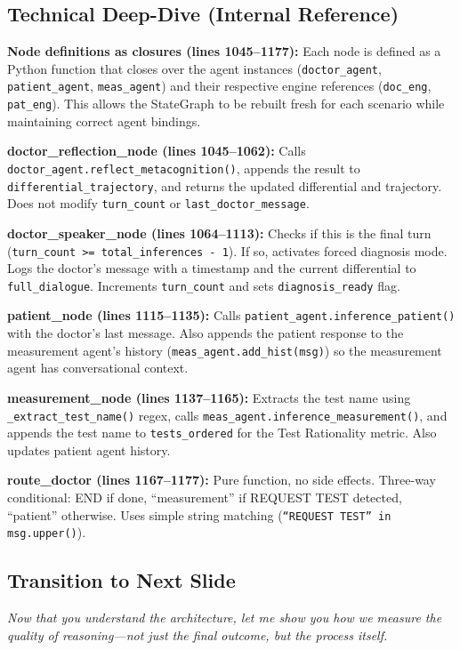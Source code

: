 \documentclass[12pt]{article}
\begin{document}
  \subsection*{Technical Deep-Dive (Internal Reference)}
  {\color{techgray}
  \textbf{Node definitions as closures (lines 1045--1177):} Each node is defined as a Python function that closes over the agent instances (\texttt{doctor\_agent}, \texttt{patient\_agent}, \texttt{meas\_agent}) and their respective engine references (\texttt{doc\_eng}, \texttt{pat\_eng}). This allows the StateGraph to be rebuilt fresh for each scenario while maintaining correct agent bindings.

  \textbf{doctor\_reflection\_node (lines 1045--1062):} Calls \texttt{doctor\_agent.reflect\_metacognition()}, appends the result to \texttt{differential\_trajectory}, and returns the updated differential and trajectory. Does not modify \texttt{turn\_count} or \texttt{last\_doctor\_message}.

  \textbf{doctor\_speaker\_node (lines 1064--1113):} Checks if this is the final turn (\texttt{turn\_count >= total\_inferences - 1}). If so, activates forced diagnosis mode. Logs the doctor's message with a timestamp and the current differential to \texttt{full\_dialogue}. Increments \texttt{turn\_count} and sets \texttt{diagnosis\_ready} flag.

  \textbf{patient\_node (lines 1115--1135):} Calls \texttt{patient\_agent.inference\_patient()} with the doctor's last message. Also appends the patient response to the measurement agent's history (\texttt{meas\_agent.add\_hist(msg)}) so the measurement agent has conversational context.

  \textbf{measurement\_node (lines 1137--1165):} Extracts the test name using \texttt{\_extract\_test\_name()} regex, calls \texttt{meas\_agent.inference\_measurement()}, and appends the test name to \texttt{tests\_ordered} for the Test Rationality metric. Also updates patient agent history.

  \textbf{route\_doctor (lines 1167--1177):} Pure function, no side effects. Three-way conditional: END if done, ``measurement'' if REQUEST TEST detected, ``patient'' otherwise. Uses simple string matching (\texttt{``REQUEST TEST'' in msg.upper()}).
  }

  \subsection*{Transition to Next Slide}
  {\color{transgreen}
  \textit{Now that you understand the architecture, let me show you how we measure the quality of reasoning---not just the final outcome, but the process itself.}
  }
\end{document}
